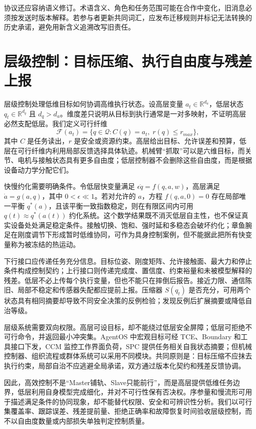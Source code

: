 协议还应容纳语义修订。术语含义、角色和任务范围可能在合作中变化，旧消息必须按发送时版本解释。若参与者更新共同词汇，应发布迁移规则并标记无法转换的历史承诺，避免用新含义追溯改写旧责任。

\section{层级控制：目标压缩、执行自由度与残差上报}
\label{sec:section_3184}

层级控制处理低维目标如何协调高维执行状态。设高层变量 $a_t\in\mathbb{R}^{d_a}$，低层状态 $q_t\in\mathbb{R}^{d_q}$ 且 $d_q>d_a$。维度差只说明从目标到执行通常是一对多映射，不证明高层必然支配低层。我们定义可行纤维
\[
\mathcal{F}(a_t)=\{q\in\mathcal{Q}:C(q)=a_t,\;r(q)\le r_{max}\},
\]
其中 $C$ 是任务读出，$r$ 是安全或资源约束。高层给出目标、允许误差和预算，低层在可行纤维内利用局部反馈选择具体轨迹。机械臂“抓取”可以是六维目标，而关节、电机与接触状态具有更多自由度；低层控制器不会删除这些自由度，而是根据设备动力学分配它们。

快慢约化需要明确条件。令低层快变量满足 $\epsilon\dot q=f(q,a,w)$，高层满足 $\dot a=g(a,q)$，其中 $0<\epsilon\ll1$。若对允许的 $a$，方程 $f(q,a,0)=0$ 存在局部唯一平衡 $q^*(a)$，且该平衡一致指数稳定，则在有限区间内可用 $q(t)\approx q^*(a(t))$ 约化系统。这个数学结果既不消灭低层自主性，也不保证真实设备处处满足稳定条件。接触切换、饱和、强时延和多稳态会破坏约化；章鱼腕足在刚度调节下形成暂时低维协同，可作为具身控制案例，但不能据此把所有快变量称为被冻结的热运动。

下行接口应传递任务充分信息。目标位姿、刚度矩阵、允许接触面、最大力和停止条件构成控制契约；上行接口则传递完成度、置信度、约束裕量和未被模型解释的残差。低层不必上传每个执行变量，但也不能只在摔倒后报告。接近力限、通信陈旧、局部不稳定和传感器失配都应提前上报。压缩器 $S(q_t)$ 是否充分，可用两个状态具有相同摘要却导致不同安全决策的反例检验；发现反例后扩展摘要或降低自治等级。

层级系统需要双向权限。高层可设目标，却不能绕过低层安全屏障；低层可拒绝不可行命令，并返回最小冲突集。AgentOS 中宏观目标可经 TCE、Boundary 和工具接口下发，CCM 监控工作界面负荷，SPC 提供任务相关自我状态摘要；但机械控制器、组织流程或群体系统可以采用不同模块。共同原则是：目标压缩不应抹去执行约束，局部自治不应逃避全局承诺，双方通过版本化契约和残差反馈协调。

因此，高效控制不是“Master铺轨、Slave只能前行”，而是高层提供低维任务边界，低层利用自身模型完成细化，并对不可行性保有否决权。序参量和慢流形可用于描述满足条件的协同现象，却不能替代权限、安全和可辨识性分析。我们以可行集覆盖率、跟踪误差、残差提前量、拒绝正确率和故障恢复时间验收层级控制，而不以自由度数量或内部损失单独判定控制质量。


